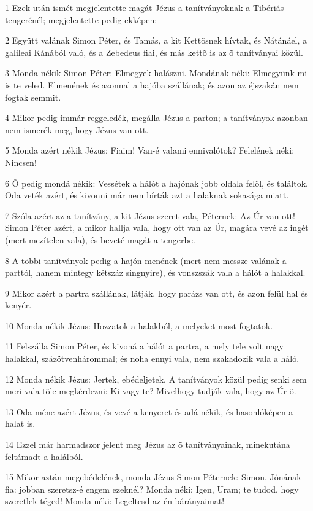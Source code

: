 \par 1 Ezek után ismét megjelentette magát Jézus a tanítványoknak a Tibériás tengerénél; megjelentette pedig ekképen:
\par 2 Együtt valának Simon Péter, és Tamás, a kit Kettõsnek hívtak, és Nátánáel, a galileai Kánából való, és a Zebedeus fiai, és más kettõ is az õ tanítványai közül.
\par 3 Monda nékik Simon Péter: Elmegyek halászni. Mondának néki: Elmegyünk mi is te veled. Elmenének és azonnal a hajóba szállának; és azon az éjszakán nem fogtak semmit.
\par 4 Mikor pedig immár reggeledék, megálla Jézus a parton; a tanítványok azonban nem ismerék meg, hogy Jézus van ott.
\par 5 Monda azért nékik Jézus: Fiaim! Van-é valami ennivalótok? Felelének néki: Nincsen!
\par 6 Õ pedig mondá nékik: Vessétek a hálót a hajónak jobb oldala felõl, és találtok. Oda veték azért, és kivonni már nem bírták azt a halaknak sokasága miatt.
\par 7 Szóla azért az a tanítvány, a kit Jézus szeret vala, Péternek: Az Úr van ott! Simon Péter azért, a mikor hallja vala, hogy ott van az Úr, magára vevé az ingét (mert mezítelen vala), és beveté magát a tengerbe.
\par 8 A többi tanítványok pedig a hajón menének (mert nem messze valának a parttól, hanem mintegy kétszáz singnyire), és vonszszák vala a hálót a halakkal.
\par 9 Mikor azért a partra szállának, látják, hogy parázs van ott, és azon felül hal és kenyér.
\par 10 Monda nékik Jézus: Hozzatok a halakból, a melyeket most fogtatok.
\par 11 Felszálla Simon Péter, és kivoná a hálót a partra, a mely tele volt nagy halakkal, százötvenhárommal; és noha ennyi vala, nem szakadozik vala a háló.
\par 12 Monda nékik Jézus: Jertek, ebédeljetek. A tanítványok közül pedig senki sem meri vala tõle megkérdezni: Ki vagy te? Mivelhogy tudják vala, hogy az Úr õ.
\par 13 Oda méne azért Jézus, és vevé a kenyeret és adá nékik, és hasonlóképen a halat is.
\par 14 Ezzel már harmadszor jelent meg Jézus az õ tanítványainak, minekutána feltámadt a halálból.
\par 15 Mikor aztán megebédelének, monda Jézus Simon Péternek: Simon, Jónának fia: jobban szeretsz-é engem ezeknél? Monda néki: Igen, Uram; te tudod, hogy szeretlek téged! Monda néki: Legeltesd az én bárányaimat!
